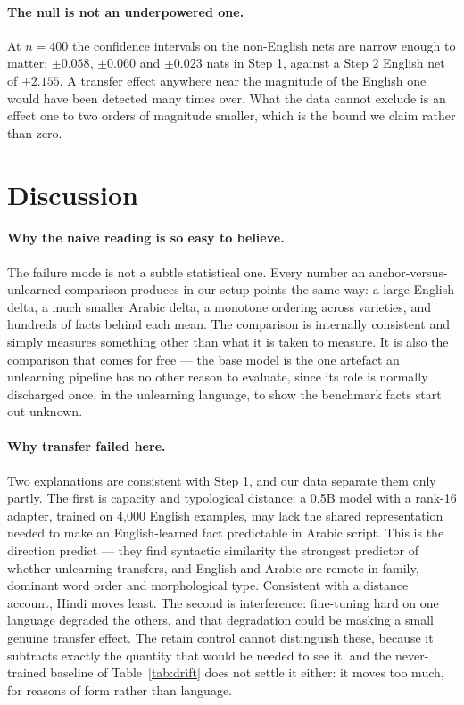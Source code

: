 \documentclass[11pt]{article}
\begin{document}
\paragraph{The null is not an underpowered one.}
At $n=400$ the confidence intervals on the non-English nets are narrow
enough to matter: $\pm 0.058$, $\pm 0.060$ and $\pm 0.023$ nats in Step 1,
against a Step 2 English net of $+2.155$. A transfer effect anywhere near
the magnitude of the English one would have been detected many times over.
What the data cannot exclude is an effect one to two orders of magnitude
smaller, which is the bound we claim rather than zero.

\section{Discussion}
\label{sec:discussion}

\paragraph{Why the naive reading is so easy to believe.}
The failure mode is not a subtle statistical one. Every number an
anchor-versus-unlearned comparison produces in our setup points the same way:
a large English delta, a much smaller Arabic delta, a monotone ordering
across varieties, and hundreds of facts behind each mean. The comparison is
internally consistent and simply measures something other than what it is
taken to measure. It is also the comparison that comes for free — the base
model is the one artefact an unlearning pipeline has no other reason to
evaluate, since its role is normally discharged once, in the unlearning
language, to show the benchmark facts start out unknown.

\paragraph{Why transfer failed here.}
Two explanations are consistent with Step 1, and our data separate them only
partly. The first is capacity and typological distance: a 0.5B model with a
rank-16 adapter, trained on 4{,}000 English examples, may lack the shared
representation needed to make an English-learned fact predictable in
Arabic script. This is the direction \citet{farashah2026multilingual}
predict — they find syntactic similarity the strongest predictor of whether
unlearning transfers, and English and Arabic are remote in family, dominant
word order and morphological type. Consistent with a distance account, Hindi
moves least. The second is interference: fine-tuning hard on one language
degraded the others, and that degradation could be masking a small genuine
transfer effect. The retain control cannot distinguish these, because it
subtracts exactly the quantity that would be needed to see it, and the
never-trained baseline of Table~\ref{tab:drift} does not settle it either: it
moves too much, for reasons of form rather than language.
\end{document}
